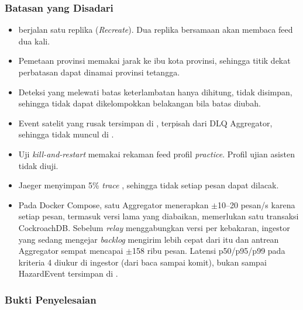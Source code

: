 \subsubsection{Batasan yang Disadari}
\begin{itemize}
\item {} berjalan satu replika (\textit{Recreate}). Dua replika bersamaan akan membaca feed dua kali.
\item Pemetaan provinsi memakai jarak ke ibu kota provinsi, sehingga titik dekat perbatasan dapat dinamai provinsi tetangga.
\item Deteksi yang melewati batas keterlambatan hanya dihitung, tidak disimpan, sehingga tidak dapat dikelompokkan belakangan bila batas diubah.
\item Event satelit yang rusak tersimpan di , terpisah dari DLQ Aggregator, sehingga tidak muncul di .
\item Uji \textit{kill-and-restart} memakai rekaman feed profil \textit{practice}. Profil ujian asisten tidak diuji.
\item Jaeger menyimpan 5\% \textit{trace} , sehingga tidak setiap pesan dapat dilacak.
\item Pada Docker Compose, satu Aggregator menerapkan $\pm$10--20 pesan/s karena setiap pesan, termasuk versi lama yang diabaikan, memerlukan satu transaksi CockroachDB. Sebelum \textit{relay} menggabungkan versi per kebakaran, ingestor yang sedang mengejar \textit{backlog} mengirim lebih cepat dari itu dan antrean Aggregator sempat mencapai $\pm$158 ribu pesan. Latensi p50/p95/p99 pada kriteria 4 diukur di ingestor (dari baca sampai komit), bukan sampai HazardEvent tersimpan di .
\end{itemize}

\subsubsection{Bukti Penyelesaian}

